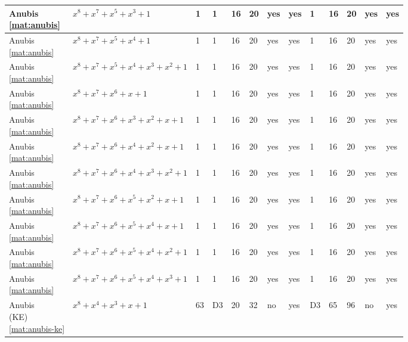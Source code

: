 \begin{tiny}
\begin{longtable}{|l|l|l|l|l|l|l|l|l|l|l|l|l|}
\shortstack{Anubis \\ \eqref{mat:anubis}} & $x^8 + x^7 + x^5 + x^3 + 1$ & 1 & 1 & 16 & 20 & yes & yes & 1 & 16 & 20 & yes & yes \\ \hline
\shortstack{Anubis \\ \eqref{mat:anubis}} & $x^8 + x^7 + x^5 + x^4 + 1$ & 1 & 1 & 16 & 20 & yes & yes & 1 & 16 & 20 & yes & yes \\ \hline
\shortstack{Anubis \\ \eqref{mat:anubis}} & $x^8 + x^7 + x^5 + x^4 + x^3 + x^2 + 1$ & 1 & 1 & 16 & 20 & yes & yes & 1 & 16 & 20 & yes & yes \\ \hline
\shortstack{Anubis \\ \eqref{mat:anubis}} & $x^8 + x^7 + x^6 + x + 1$ & 1 & 1 & 16 & 20 & yes & yes & 1 & 16 & 20 & yes & yes \\ \hline
\shortstack{Anubis \\ \eqref{mat:anubis}} & $x^8 + x^7 + x^6 + x^3 + x^2 + x + 1$ & 1 & 1 & 16 & 20 & yes & yes & 1 & 16 & 20 & yes & yes \\ \hline
\shortstack{Anubis \\ \eqref{mat:anubis}} & $x^8 + x^7 + x^6 + x^4 + x^2 + x + 1$ & 1 & 1 & 16 & 20 & yes & yes & 1 & 16 & 20 & yes & yes \\ \hline
\shortstack{Anubis \\ \eqref{mat:anubis}} & $x^8 + x^7 + x^6 + x^4 + x^3 + x^2 + 1$ & 1 & 1 & 16 & 20 & yes & yes & 1 & 16 & 20 & yes & yes \\ \hline
\shortstack{Anubis \\ \eqref{mat:anubis}} & $x^8 + x^7 + x^6 + x^5 + x^2 + x + 1$ & 1 & 1 & 16 & 20 & yes & yes & 1 & 16 & 20 & yes & yes \\ \hline
\shortstack{Anubis \\ \eqref{mat:anubis}} & $x^8 + x^7 + x^6 + x^5 + x^4 + x + 1$ & 1 & 1 & 16 & 20 & yes & yes & 1 & 16 & 20 & yes & yes \\ \hline
\shortstack{Anubis \\ \eqref{mat:anubis}} & $x^8 + x^7 + x^6 + x^5 + x^4 + x^2 + 1$ & 1 & 1 & 16 & 20 & yes & yes & 1 & 16 & 20 & yes & yes \\ \hline
\shortstack{Anubis \\ \eqref{mat:anubis}} & $x^8 + x^7 + x^6 + x^5 + x^4 + x^3 + 1$ & 1 & 1 & 16 & 20 & yes & yes & 1 & 16 & 20 & yes & yes \\ \hline
\shortstack{Anubis \\ (KE) \\ \eqref{mat:anubis-ke}} & $x^8 + x^4 + x^3 + x + 1$ & 63 & D3 & 20 & 32 & no & yes & D3 & 65 & 96 & no & yes \\ \hline

\end{longtable}
\end{tiny}
